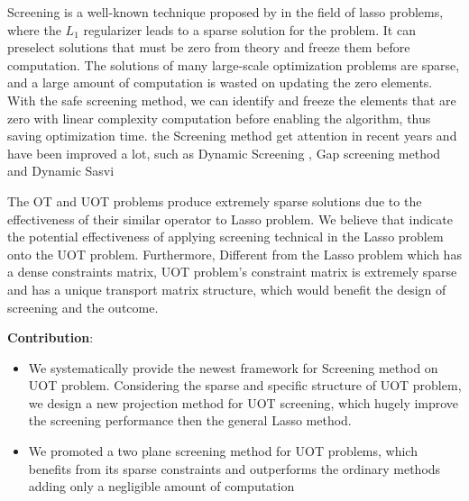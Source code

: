 Screening is a well-known technique proposed by \citep{ghaoui2010safe} in the field of lasso problems, where the $L_1$ regularizer leads to a sparse solution for the problem. It can preselect solutions that must be zero from theory and freeze them before computation. The solutions of many large-scale optimization problems are sparse, and a large amount of computation is wasted on updating the zero elements. With the safe screening method, we can identify and freeze the elements that are zero with linear complexity computation before enabling the algorithm, thus saving optimization time. the Screening method get attention in recent years and have been improved a lot, such as Dynamic Screening \citep{7128732}, Gap screening method \citep{JMLR:v18:16-577} and Dynamic Sasvi \citep{NEURIPS2021_7b5b23f4} 

The OT and UOT problems produce extremely sparse solutions due to the effectiveness of their similar operator to Lasso problem. We believe that indicate the potential effectiveness of applying screening technical in the Lasso problem onto the UOT problem. Furthermore,  Different from the Lasso problem which has a dense constraints matrix, UOT problem's constraint matrix is extremely sparse and has a unique transport matrix structure, which would benefit the design of screening and the outcome.


\textbf{Contribution}: 
\begin{itemize}
\item We systematically provide the newest framework for Screening method on UOT problem. Considering the sparse and specific structure of UOT problem, we design a new projection method for UOT screening,  which hugely improve the screening performance then the general Lasso method. 
\item We promoted a two plane screening method for UOT problems, which benefits from its sparse constraints and outperforms the ordinary methods adding only a negligible amount of computation
\end{itemize}



